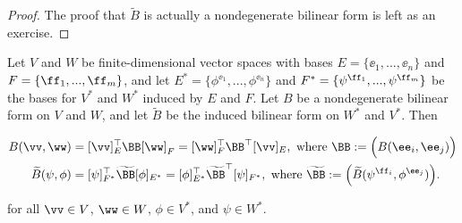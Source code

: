 \begin{proof}
    The proof that $\widetilde{B}$ is actually a nondegenerate bilinear form is left as an exercise.
\end{proof}

\begin{lemma}
     Let $V$ and $W$ be finite-dimensional vector spaces with bases $E = \{\ee_1, ..., \ee_n\}$ and $F = \{\ff_1, ..., \ff_m\}$, and let $E^* = \{\phi^{\ee_1}, ..., \phi^{\ee_n}\}$ and $F^* = \{\psi^{\ff_1}, ..., \psi^{\ff_m}\}$ be the bases for $V^*$ and $W^*$ induced by $E$ and $F$. Let $B$ be a nondegenerate bilinear form on $V$ and $W$, and let $\widetilde{B}$ be the induced bilinear form on $W^*$ and $V^*$. Then 

    \begin{align*}
        B(\vv, \ww) &= [\vv]_E^\top \BB [\ww]_F = [\ww]_F^\top \BB^\top [\vv]_E, \text{ where $\BB := \Big(B(\ee_i, \ee_j)\Big)$}
        \\
        \widetilde{B}(\psi, \phi) &= [\psi]_{F^*}^\top \widetilde{\BB} [\phi]_{E^*} = [\phi]_{E^*}^\top \widetilde{\BB}^\top [\psi]_{F^*}, \text{ where $\widetilde{\BB} := \Big(\widetilde{B}(\psi^{\ff_i}, \phi^{\ee_j})\Big)$}.
    \end{align*}
    
    for all $\vv \in V$, $\ww \in W$, $\phi \in V^*$, and $\psi \in W^*$.
\end{lemma}

